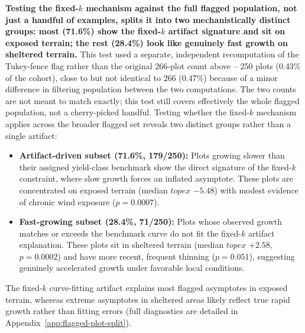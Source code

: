 \documentclass[logo,msc,ai]{infthesis}           %
\begin{document}
\textbf{Testing the fixed-$k$ mechanism against the full flagged population, not just a handful of examples, splits it into two mechanistically distinct groups: most (71.6\%) show the fixed-$k$ artifact signature and sit on exposed terrain; the rest (28.4\%) look like genuinely fast growth on sheltered terrain.}
This test used a separate, independent recomputation of the Tukey-fence flag rather than the original 266-plot count above -- 250 plots (0.43\% of the cohort), close to but not identical to 266 (0.47\%) because of a minor difference in filtering population between the two computations. The two counts are not meant to match exactly; this test still covers effectively the whole flagged population, not a cherry-picked handful. %
Testing whether the fixed-$k$ mechanism applies across the broader flagged set reveals two distinct groups rather than a single artifact:
\begin{itemize}
    \item \textbf{Artifact-driven subset (71.6\%, 179/250):} Plots growing slower than their assigned yield-class benchmark show the direct signature of the fixed-$k$ constraint, where slow growth forces an inflated asymptote. These plots are concentrated on exposed terrain (median $\mathit{topex}$ $-5.48$) with modest evidence of chronic wind exposure ($p = 0.0007$).
    \item \textbf{Fast-growing subset (28.4\%, 71/250):} Plots whose observed growth matches or exceeds the benchmark curve do not fit the fixed-$k$ artifact explanation. These plots sit in sheltered terrain (median $\mathit{topex}$ $+2.58$, $p = 0.0002$) and have more recent, frequent thinning ($p = 0.051$), suggesting genuinely accelerated growth under favorable local conditions.
\end{itemize}
The fixed-$k$ curve-fitting artifact explains most flagged asymptotes in exposed terrain, whereas extreme asymptotes in sheltered areas likely reflect true rapid growth rather than fitting errors (full diagnostics are detailed in Appendix~\ref{app:flagged-plot-split}).
\end{document}
